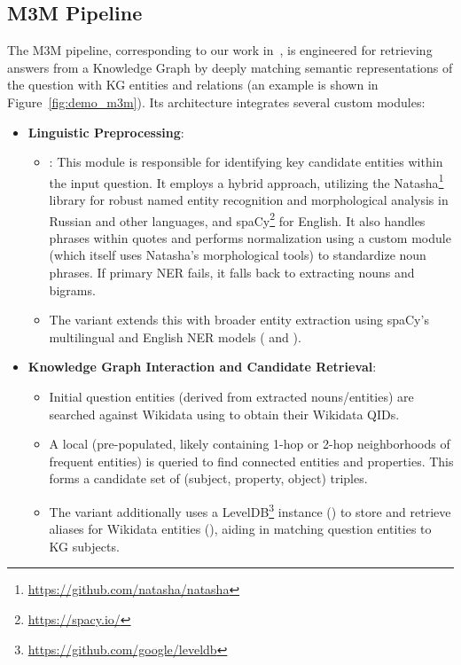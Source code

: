 \subsection{M3M Pipeline}
The M3M pipeline, corresponding to our work in~\cite{DBLP:conf/acl/RazzhigaevSMBP23}, is engineered for retrieving answers from a Knowledge Graph by deeply matching semantic representations of the question with KG entities and relations (an example is shown in Figure~\ref{fig:demo_m3m}). Its architecture integrates several custom modules:

\begin{itemize}
    \item \textbf{Linguistic Preprocessing}:
    \begin{itemize}
        \item {}: This module is responsible for identifying key candidate entities within the input question. It employs a hybrid approach, utilizing the Natasha\footnote{\url{https://github.com/natasha/natasha}} library for robust named entity recognition and morphological analysis in Russian and other languages, and spaCy\footnote{\url{https://spacy.io/}} for English. It also handles phrases within quotes and performs normalization using a custom  module (which itself uses Natasha's morphological tools) to standardize noun phrases. If primary NER fails, it falls back to extracting nouns and bigrams.
        \item The  variant extends this with broader entity extraction using spaCy's multilingual and English NER models ( and ).
    \end{itemize}
    \item \textbf{Knowledge Graph Interaction and Candidate Retrieval}:
    \begin{itemize}
        \item Initial question entities (derived from extracted nouns/entities) are searched against Wikidata using  to obtain their Wikidata QIDs.
        \item A local  (pre-populated, likely containing 1-hop or 2-hop neighborhoods of frequent entities) is queried to find connected entities and properties. This forms a candidate set of (subject, property, object) triples.
        \item The  variant additionally uses a LevelDB\footnote{\url{https://github.com/google/leveldb}} instance () to store and retrieve aliases for Wikidata entities (), aiding in matching question entities to KG subjects.

\end{itemize}
\end{itemize}
